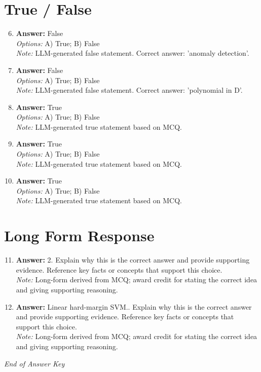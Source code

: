 \documentclass[12pt]{article}
\begin{document}
\section*{True / False}
\begin{enumerate}[label=\arabic*.]
\setcounter{enumi}{5}
\item \textbf{Answer:} False
\\ \textit{Options:} A) True; B) False
\\ \textit{Note:} LLM-generated false statement. Correct answer: 'anomaly detection'.
\item \textbf{Answer:} False
\\ \textit{Options:} A) True; B) False
\\ \textit{Note:} LLM-generated false statement. Correct answer: 'polynomial in D'.
\item \textbf{Answer:} True
\\ \textit{Options:} A) True; B) False
\\ \textit{Note:} LLM-generated true statement based on MCQ.
\item \textbf{Answer:} True
\\ \textit{Options:} A) True; B) False
\\ \textit{Note:} LLM-generated true statement based on MCQ.
\item \textbf{Answer:} True
\\ \textit{Options:} A) True; B) False
\\ \textit{Note:} LLM-generated true statement based on MCQ.
\end{enumerate}

\section*{Long Form Response}
\begin{enumerate}[label=\arabic*.]
\setcounter{enumi}{10}
\item \textbf{Answer:} 2. Explain why this is the correct answer and provide supporting evidence. Reference key facts or concepts that support this choice.
\\ \textit{Note:} Long-form derived from MCQ; award credit for stating the correct idea and giving supporting reasoning.
\item \textbf{Answer:} Linear hard-margin SVM.. Explain why this is the correct answer and provide supporting evidence. Reference key facts or concepts that support this choice.
\\ \textit{Note:} Long-form derived from MCQ; award credit for stating the correct idea and giving supporting reasoning.
\end{enumerate}

\vfill
\noindent\textit{End of Answer Key}
\end{document}
